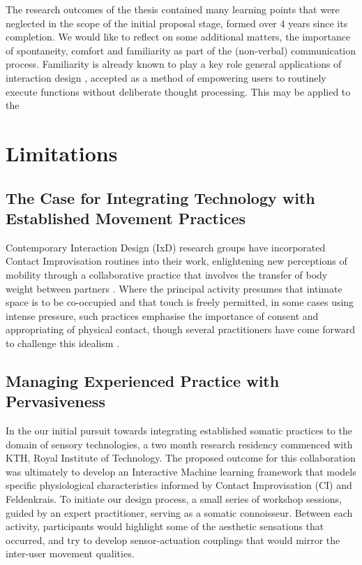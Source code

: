 The research outcomes of the thesis contained many learning points that were neglected in the scope of the initial proposal stage, formed over 4 years since its completion. We would like to reflect on some additional matters, the importance of spontaneity, comfort and familiarity as part of the (non-verbal) communication process. Familiarity is already known to play a key role general applications of interaction design \cite{}, accepted as a method of empowering users to routinely execute functions without deliberate thought processing. This may be applied to the 

\section{Limitations}
\label{sec:limitations}

\subsection{The Case for Integrating Technology with Established Movement Practices}

Contemporary Interaction Design (IxD) research groups have incorporated Contact Improvisation routines into their work, enlightening new perceptions of mobility through a collaborative practice that involves the transfer of body weight between partners \cite{bomba_somacoustics_2019, barrero_gonzalez_dance_2019}. Where the principal activity presumes that intimate space is to be co-occupied and that touch is freely permitted, in some cases using intense pressure, such practices emphasise the importance of consent and appropriating of physical contact, though several practitioners have come forward to challenge this idealism \cite{tai_exploring_2017,beaulieux_how_2019}.

\subsection{Managing Experienced Practice with Pervasiveness}

In the our initial pursuit towards integrating established somatic practices to the domain of sensory technologies, a two month research residency commenced with KTH, Royal Institute of Technology. The proposed outcome for this collaboration was ultimately to develop an Interactive Machine learning framework that models specific physiological characteristics informed by Contact Improvisation (CI) and Feldenkrais. To initiate our design process, a small series of workshop sessions, guided by an expert practitioner, serving as a somatic connoisseur. Between each activity, participants would highlight some of the aesthetic sensations that occurred, and try to develop sensor-actuation couplings that would mirror the inter-user movement qualities.

